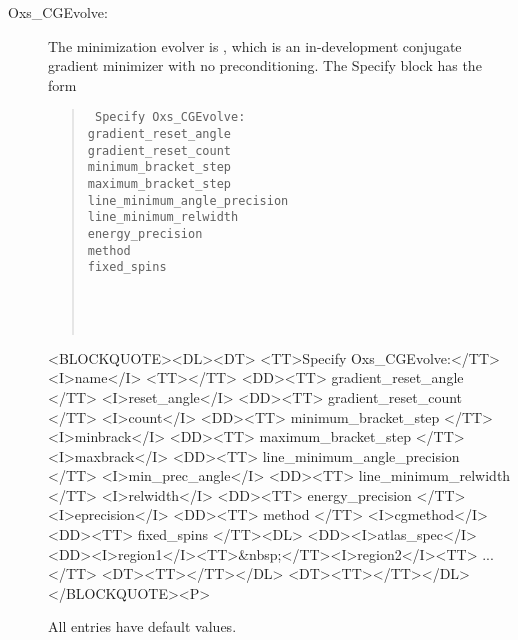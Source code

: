 \begin{description}
%
\item[Oxs\_CGEvolve:\label{html:CGEvolve}]
The minimization evolver is , which is an
in-development conjugate gradient minimizer with no preconditioning. The
Specify block has the form
   \begin{latexonly}
   \begin{quote}\tt
   Specify Oxs\_CGEvolve: \ocb\\
    \bi gradient\_reset\_angle   \\
    \bi gradient\_reset\_count   \\
    \bi minimum\_bracket\_step   \\
    \bi maximum\_bracket\_step   \\
    \bi line\_minimum\_angle\_precision \\
    \bi line\_minimum\_relwidth  \\
    \bi energy\_precision \\
    \bi method \\
    \bi fixed\_spins \ocb\\
    \bi\bi {}\\
    \bi\bi  {}\\
    \bi\ccb\\
   \ccb
   \end{quote}
   \end{latexonly}%
   \begin{rawhtml}
   <BLOCKQUOTE><DL><DT>
   <TT>Specify Oxs_CGEvolve:</TT><I>name</I> <TT>{</TT>
   <DD><TT> gradient_reset_angle </TT> <I>reset_angle</I>
   <DD><TT> gradient_reset_count </TT> <I>count</I>
   <DD><TT> minimum_bracket_step </TT> <I>minbrack</I>
   <DD><TT> maximum_bracket_step </TT> <I>maxbrack</I>
   <DD><TT> line_minimum_angle_precision </TT> <I>min_prec_angle</I>
   <DD><TT> line_minimum_relwidth </TT> <I>relwidth</I>
   <DD><TT> energy_precision </TT> <I>eprecision</I>
   <DD><TT> method </TT> <I>cgmethod</I>
   <DD><TT> fixed_spins {</TT><DL>
       <DD><I>atlas_spec</I>
       <DD><I>region1</I><TT>&nbsp;</TT><I>region2</I><TT> ...</TT>
       <DT><TT>}</TT></DL>
   <DT><TT>}</TT></DL></BLOCKQUOTE><P>
   \end{rawhtml}
All entries have default values.


\end{description}
